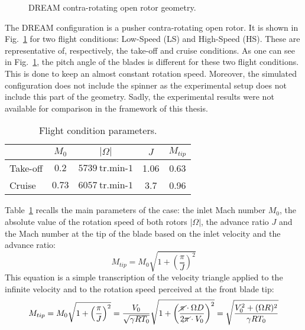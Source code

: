 

\begin{figure}[htb]
  \centering
  \caption{DREAM contra-rotating open rotor geometry.}
  \label{fig:dream_wall}
\end{figure}

The DREAM configuration is a pusher contra-rotating open rotor.
It is shown in Fig.~\ref{fig:dream_wall}
for two flight conditions: Low-Speed (LS) and High-Speed (HS).
These are representative of, respectively, the take-off and
cruise conditions. As one can see in Fig.~\ref{fig:dream_wall},
the pitch angle of the blades is different for these two flight conditions.
This is done to keep an almost constant rotation speed. Moreover,
the simulated configuration does not include the spinner as the
experimental setup does not include this part of the geometry.
Sadly, the experimental results were not available for comparison
in the framework of this thesis.
\begin{table}[htbp]
   \centering
  \begin{tabular}{lcccc}
    \toprule
    \phantom{abdefghijk}& $M_0$ & $|\Omega|$ & $J$ & $M_{tip}$ \\
    \midrule
    Take-off & $0.2$ & $5739~\textrm{tr.min-1}$ & 1.06 & 0.63 \\
    Cruise & $0.73$ & $6057~\textrm{tr.min-1}$ & 3.7 & 0.96  \\
    \bottomrule
  \end{tabular}
  \caption{Flight condition parameters.}
  \label{tab:dream_flight_condition}
\end{table} 
Table~\ref{tab:dream_flight_condition} recalls the main
parameters of the case: the inlet Mach number $M_0$,
the absolute value of the rotation speed of both rotors $|\Omega|$,
the advance ratio $J$ and the Mach number at the tip of
the blade based on the inlet velocity and the advance ratio:
\begin{equation}
	M_{tip} = M_0 \sqrt{1 + \left(\frac{\pi}{J} \right)^2}
\end{equation}
This equation is a simple transcription of the velocity triangle
applied to the infinite velocity and to the rotation speed perceived
at the front blade tip:
\begin{equation}
    M_{tip} = M_0 \sqrt{1 + \left(\frac{\pi}{J}\right)^2} = 
    \frac{V_0}{\sqrt{\gamma R T_0}} \sqrt{1 + \left(\frac{
    	\cancel{\pi} \cdot \Omega D}{
    	2 \cancel{\pi} \cdot V_0}\right)^2} =
    \sqrt{\frac{V_0^2 + (\Omega R)^2}{\gamma R T_0}}
    \label{eq:m_tip_explained}
\end{equation}
